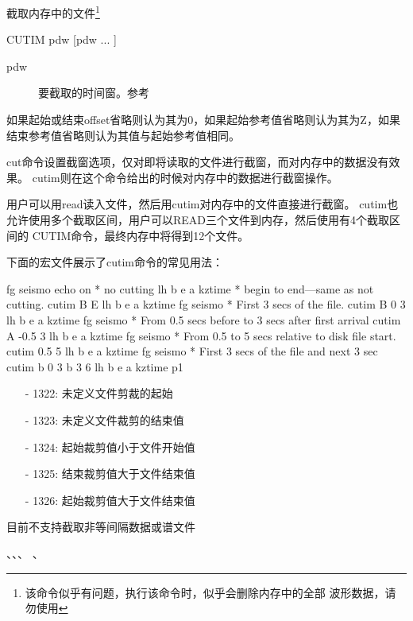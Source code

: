 \label{cmd:cutim}

截取内存中的文件\footnote{该命令似乎有问题，执行该命令时，似乎会删除内存中的全部
波形数据，请勿使用}

\begin{SACSTX}
CUTIM pdw [pdw ... ]
\end{SACSTX}

\begin{description}
\item [pdw] 要截取的时间窗。参考
\end{description}

如果起始或结束offset省略则认为其为0，如果起始参考值省略则认为其为Z，如果结束参考值省略则认为其值与起始参考值相同。

cut命令设置截窗选项，仅对即将读取的文件进行截窗，而对内存中的数据没有效果。
cutim则在这个命令给出的时候对内存中的数据进行截窗操作。

用户可以用read读入文件，然后用cutim对内存中的文件直接进行截窗。
cutim也允许使用多个截取区间，用户可以READ三个文件到内存，然后使用有4个截取区间的
CUTIM命令，最终内存中将得到12个文件。

下面的宏文件展示了cutim命令的常见用法：
\begin{SACCode}
fg seismo
echo on
* no cutting
lh b e a kztime
* begin to end---same as not cutting.
cutim B E
lh b e a kztime
fg seismo
* First 3 secs of the file.
cutim B 0 3
lh b e a kztime
fg seismo
* From 0.5 secs before to 3 secs after first arrival
cutim A -0.5 3
lh b e a kztime
fg seismo
* From 0.5 to 5 secs relative to disk file start.
cutim 0.5 5
lh b e a kztime
fg seismo
* First 3 secs of the file and next 3 sec
cutim b 0 3 b 3 6
lh b e a kztime
p1
\end{SACCode}

\begin{itemize}
\item[-]1322: 未定义文件剪裁的起始
\item[-]1323: 未定义文件裁剪的结束值
\item[-]1324: 起始裁剪值小于文件开始值
\item[-]1325: 结束裁剪值大于文件结束值
\item[-]1326: 起始裁剪值大于文件结束值
\end{itemize}

目前不支持截取非等间隔数据或谱文件

、、、
、
